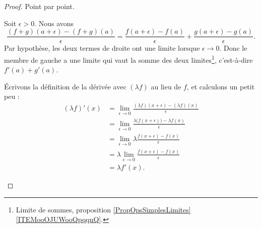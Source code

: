 \begin{proof}
	Point par point.
	\begin{subproof}
		Soit \( \epsilon>0\). Nous avons
		\begin{equation}
			\frac{ (f+g)(a+\epsilon)-(f+g)(a) }{ \epsilon }=\frac{ f(a+\epsilon)-f(a) }{ \epsilon }+\frac{ g(a+\epsilon)-g(a) }{ \epsilon }.
		\end{equation}
		Par hypothèse, les deux termes de droite ont une limite lorsque \( \epsilon\to 0\). Donc le membre de gauche a une limite qui vaut la somme des deux limites\footnote{Limite de sommes, proposition \ref{PropOpsSimplesLimites}\ref{ITEMooOJUWooQpqqnQ}.}, c'est-à-dire \( f'(a)+g'(a)\).

		Écrivons la définition de la dérivée avec \( (\lambda f)\) au lieu de \( f\), et calculons un petit peu :
		\begin{subequations}
			\begin{align}
				(\lambda f)'(x) & =\lim_{\epsilon\to 0}\frac{ (\lambda f)(x+\epsilon)-(\lambda f)(x) }{ \epsilon }         \\
				                & =\lim_{\epsilon\to 0}\frac{ \lambda \big( f(x+\epsilon) \big)-\lambda f(x) }{ \epsilon } \\
				                & =\lim_{\epsilon\to 0}\lambda \frac{ f(x+\epsilon) -f(x) }{ \epsilon }                    \\
				                & =\lambda \lim_{\epsilon\to 0}\frac{ f(x+\epsilon) -f(x) }{ \epsilon }                    \\
				                & =\lambda f'(x).
			\end{align}
		\end{subequations}


\end{subproof}
\end{proof}
